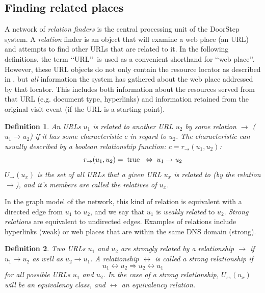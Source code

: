 \documentclass[a4paper]{danarticle}
\newtheorem{definition}{Definition}
\theoremstyle{remark}
\begin{document}
     \subsection{Finding related places} 
       A network of \textit{relation finders} is the central processing unit of 
       the DoorStep system. A \textit{relation} finder is an object that will 
       examine a web place (an URL) and attempts to find other URLs that are 
       related to it. In the following definitions, the term \lq\lq URL\rq\rq\ 
       is used as a convenient shorthand for \lq\lq web place\rq\rq . However, 
       these URL objects do not only contain the resource locator as described 
       in \cite{url}, but \emph{all} information the system has gathered about 
       the web place addressed by that locator. This includes both information 
       about  the resources served from that URL (e.g. document type, hyperlinks) 
       and information retained from the original visit event (if the URL is a 
       starting point).
       \begin{definition}
       An URLs $ u_1 $ is related to another URL $ u_2 $ by some relation 
       $ \rightarrow $
       ($ u_1 \rightarrow u_2 $) if it has some characteristic $ c $ in regard
       to $ u_2 $. The characteristic can usually described by a boolean
       relationship function: $ c = r_{\rightarrow}(u_1, u_2) $:
       \[
         r_{\rightarrow}(u_1, u_2) = \hspace{1mm} \mbox{true} \hspace{2mm} 
	     \Leftrightarrow \hspace{1mm} u_1 \rightarrow u_2
       \]
       $ U_{\rightarrow}(u_x) $ is the set of all URLs that a given URL $ u_x $ 
       is related to (by the relation $ \rightarrow $), and it's members are 
       called the \emph{relatives} of $ u_x $.
       \end{definition}
       In the graph model of the network, this kind of relation is equivalent
       with a directed edge from $ u_1 $ to $ u_2 $, and we say that $ u_1 $ is
       \textit{weakly related} to $ u_2 $. \textit{Strong relations} are
       equivalent to undirected edges.
       Examples of relations include hyperlinks (weak) or web places that are
       within the same DNS domain (strong). 
       \begin{definition}
       Two URLs $ u_1 $ and $ u_2 $ are \emph{strongly related} by a relationship
       $ \rightarrow $ if $ u_1 \rightarrow u_2 $ as well as 
       $ u_2 \rightarrow u_1 $. A relationship $ \leftrightarrow $ is called a
       \emph{strong} relationship if
       \[
         u_1 \leftrightarrow u_2 \Rightarrow u_2 \leftrightarrow u_1 
       \]
       for all possible URLs $ u_1 $ and $ u_2 $. In the case of a strong 
       relationship, $ U_{\leftrightarrow}(u_x) $ will be an equivalency 
       class, and $ \leftrightarrow $ an equivalency relation.
       \end{definition}
\end{document}

